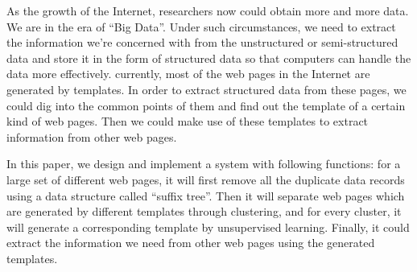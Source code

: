 
\begin{eabstract} 
  As the growth of the Internet, researchers now could obtain more and more
  data. We are in the era of ``Big Data''. Under such circumstances, we need to
  extract the information we're concerned with from the unstructured or
  semi-structured data and store it in the form of structured data so that
  computers can handle the data more effectively. currently, most of the web
  pages in the Internet are generated by templates. In order to extract
  structured data from these pages, we could dig into the common points of them
  and find out the template of a certain kind of web pages. Then we could make
  use of these templates to extract information from other web pages.

  In this paper, we design and implement a system with following functions: for
  a large set of different web pages, it will first remove all the duplicate
  data records using a data structure called ``suffix tree''. Then it will
  separate web pages which are generated by different templates through
  clustering, and for every cluster, it will generate a corresponding template
  by unsupervised learning. Finally, it could extract the information we need
  from other web pages using the generated templates.
\end{eabstract}

